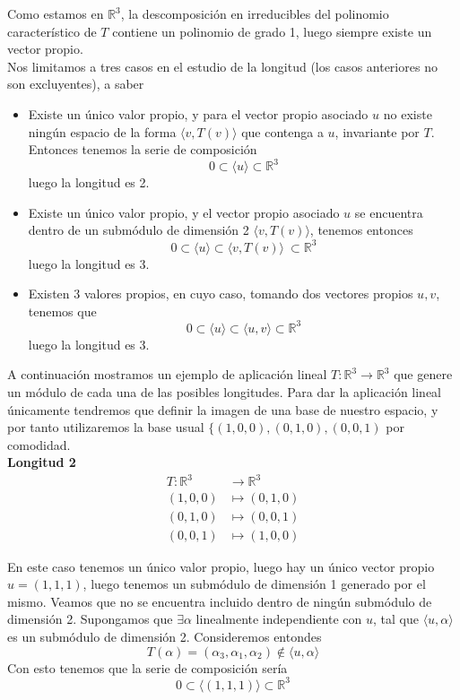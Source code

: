 Como estamos en \(\mathbb{R}^3\), la descomposición en irreducibles del
polinomio característico de \(T\) contiene un polinomio de grado 1, luego
siempre existe un vector propio.\\

Nos limitamos a tres casos en el estudio de la longitud (los casos
anteriores no son excluyentes), a saber
\begin{itemize}
\item Existe un único valor propio, y para el vector propio asociado \(u\)  no existe ningún espacio de la forma
  \(\langle v, T(v)\rangle \) que contenga a \(u\), invariante por \(T\). Entonces tenemos la serie de composición
  \[
    0 \subset \langle u \rangle \subset \mathbb{R}^3
  \]
  luego la longitud es 2.
\item Existe un único valor propio, y el vector propio asociado \(u\) se encuentra dentro de un submódulo de
  dimensión 2 \(\langle v, T(v) \rangle\), tenemos entonces
  \[
    0 \subset \langle u \rangle \subset \langle v, T(v) \rangle\ \subset \mathbb{R}^3
  \]
  luego la longitud es 3.
\item Existen 3 valores propios, en cuyo caso, tomando dos vectores propios \(u,v\), tenemos que
\[
0 \subset \langle u \rangle \subset \langle u, v \rangle \subset \mathbb{R}^3
\]
luego la longitud es 3.
\end{itemize}

A continuación mostramos un ejemplo de aplicación lineal \(T:\mathbb{R}^3 \rightarrow \mathbb{R}^3\) que genere un módulo de cada una de las posibles longitudes.
Para dar la aplicación lineal únicamente tendremos que definir la imagen de una base de nuestro espacio, y por tanto utilizaremos la base usual
\(\{(1,0,0), (0,1,0), (0,0,1)\) por comodidad.\\

\textbf{Longitud 2}%
\[
\begin{aligned}
  T:\mathbb{R}^3 &\rightarrow \mathbb{R}^3\\
  (1,0,0) &\mapsto (0,1,0)\\
  (0,1,0) &\mapsto (0,0,1)\\
  (0,0,1) &\mapsto (1,0,0)
\end{aligned}
\]


En este caso tenemos un único valor propio, luego hay un único vector propio \(u = (1,1,1)\), luego tenemos un
submódulo de dimensión 1 generado por el mismo. Veamos que no se encuentra
incluido dentro de ningún submódulo de dimensión 2.
Supongamos que \(\exists \alpha\) linealmente independiente con \(u\), tal que
\(\langle u, \alpha \rangle\) es un submódulo de dimensión 2. Consideremos
entondes
\[
  T(\alpha) = (\alpha_3, \alpha_1, \alpha_2) \not \in \langle u , \alpha \rangle
\]
Con esto tenemos que la serie de composición sería
\[
        0 \subset \langle (1,1,1) \rangle \subset \mathbb{R}^3
\]

